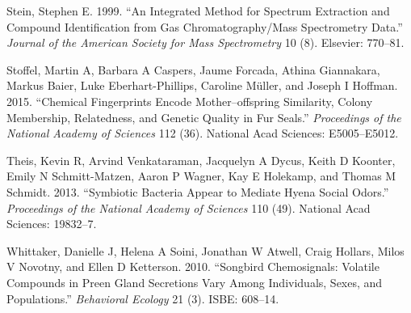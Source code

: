 \documentclass[]{article}
\begin{document}
\hypertarget{ref-stein1999integrated}{}
Stein, Stephen E. 1999. ``An Integrated Method for Spectrum Extraction
and Compound Identification from Gas Chromatography/Mass Spectrometry
Data.'' \emph{Journal of the American Society for Mass Spectrometry} 10
(8). Elsevier: 770--81.

\hypertarget{ref-stoffel2015chemical}{}
Stoffel, Martin A, Barbara A Caspers, Jaume Forcada, Athina Giannakara,
Markus Baier, Luke Eberhart-Phillips, Caroline Müller, and Joseph I
Hoffman. 2015. ``Chemical Fingerprints Encode Mother--offspring
Similarity, Colony Membership, Relatedness, and Genetic Quality in Fur
Seals.'' \emph{Proceedings of the National Academy of Sciences} 112
(36). National Acad Sciences: E5005--E5012.

\hypertarget{ref-theis2013symbiotic}{}
Theis, Kevin R, Arvind Venkataraman, Jacquelyn A Dycus, Keith D Koonter,
Emily N Schmitt-Matzen, Aaron P Wagner, Kay E Holekamp, and Thomas M
Schmidt. 2013. ``Symbiotic Bacteria Appear to Mediate Hyena Social
Odors.'' \emph{Proceedings of the National Academy of Sciences} 110
(49). National Acad Sciences: 19832--7.

\hypertarget{ref-whittaker2010songbird}{}
Whittaker, Danielle J, Helena A Soini, Jonathan W Atwell, Craig Hollars,
Milos V Novotny, and Ellen D Ketterson. 2010. ``Songbird Chemosignals:
Volatile Compounds in Preen Gland Secretions Vary Among Individuals,
Sexes, and Populations.'' \emph{Behavioral Ecology} 21 (3). ISBE:
608--14.
\end{document}
